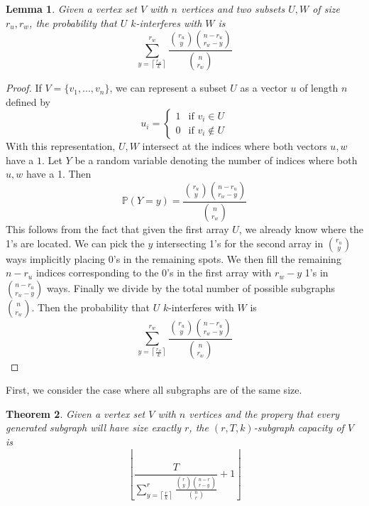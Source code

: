 \documentclass[10pt]{extarticle}
\newtheorem{theorem}{Theorem}
\newtheorem{lemma}[theorem]{Lemma}
\theoremstyle{definition}
\begin{document}
\begin{lemma}
    Given a vertex set $V$ with $n$ vertices and two subsets $U,W$ of size $r_u,r_w$, the probability that $U$ $k$-interferes with $W$ is 
    \begin{equation*}
        \sum_{y = \left\lceil \frac{r_w}{k} \right\rceil}^{r_w}  \frac{\binom{r_u}{y} \binom{n-r_u}{r_w-y}}{\binom{n}{r_w}}
    \end{equation*}
\end{lemma}
\begin{proof}
    If $V = \{v_1,...,v_n\}$, we can represent a subset $U$ as a vector $u$ of length $n$ defined by
    $$
    u_i = \begin{cases}
        1 & \text{if } v_i \in U \\
        0 & \text{if } v_i \notin U
    \end{cases}
    $$
    With this representation, $U,W$ intersect at the indices where both vectors $u, w$ have a $1$. Let $Y$ be a random variable denoting the number of indices where both $u, w$ have a 1. Then 
    \begin{equation}
        \mathbb{P}(Y=y) = \frac{\binom{r_u}{y} \binom{n-r_u}{r_w-y}}{\binom{n}{r_w}}
    \end{equation}
    This follows from the fact that given the first array $U$, we already know where the 1's are located. We can pick the $y$ intersecting 1's for the second array in $\binom{r_u}{y}$ ways implicitly placing 0's in the remaining spots. We then fill the remaining $n-r_u$ indices corresponding to the 0's in the first array with $r_w-y$ 1's in $\binom{n-r_u}{r_w-y}$ ways. Finally we divide by the total number of possible subgraphs $\binom{n}{r_w}$. 
    Then the probability that $U$ $k$-interferes with $W$ is 
    \begin{equation}
        \sum_{y = \left\lceil \frac{r_w}{k} \right\rceil}^{r_w}  \frac{\binom{r_u}{y} \binom{n-r_u}{r_w-y}}{\binom{n}{r_w}}
    \end{equation}
\end{proof}

First, we consider the case where all subgraphs are of the same size.

\begin{theorem}
    Given a vertex set $V$ with $n$ vertices and the propery that every generated subgraph will have size exactly $r$, the $(r,T,k)$-subgraph capacity of $V$ is 
    \begin{equation*}
        \left\lfloor \frac{T}{\sum_{y = \left\lceil \frac{r}{k} \right\rceil}^{r}  \frac{\binom{r}{y} \binom{n-r}{r-y}}{\binom{n}{r}}} + 1 \right\rfloor
    \end{equation*}
\end{theorem}
\end{document}
